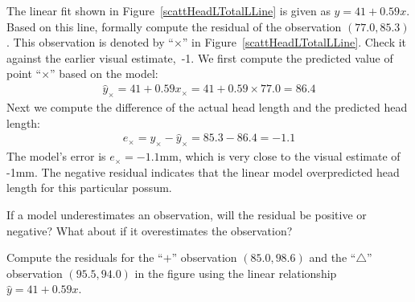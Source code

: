 \begin{examplewrap}
\begin{nexample}{The linear fit shown in Figure~\ref{scattHeadLTotalLLine} is given as $\hat{y} = 41 + 0.59x$. Based on this line, formally compute the residual of the observation $(77.0, 85.3)$. This observation is denoted by ``$\times$'' in Figure~\ref{scattHeadLTotalLLine}.
Check it against the earlier visual estimate,~-1.}
We first compute the predicted value of point ``$\times$'' based on the model:
\begin{eqnarray*}
\hat{y}_{\times} = 41+0.59x_{\times} = 41+0.59\times 77.0 = 86.4
\end{eqnarray*}
Next we compute the difference of the actual head length and the predicted head length:
\begin{eqnarray*}
e_{\times} = y_{\times} - \hat{y}_{\times} = 85.3 -  86.4 = -1.1
\end{eqnarray*}
The model's error is $e_{\times} = -1.1$mm,
which is very close to the visual estimate of -1mm.
The negative residual indicates that the linear model
overpredicted head length for this particular possum.
\end{nexample}
\end{examplewrap}

\begin{exercisewrap}
\begin{nexercise}
If a model underestimates an observation, will the residual be positive or negative? What about if it overestimates the observation?\footnotemark
\end{nexercise}
\end{exercisewrap}

\begin{exercisewrap}
\begin{nexercise}
Compute the residuals for the ``$+$'' observation $(85.0, 98.6)$
and the ``$\triangle$'' observation $(95.5, 94.0)$ in the figure
using the linear relationship $\hat{y} = 41 + 0.59x$.\footnotemark{}
\end{nexercise}
\end{exercisewrap}

